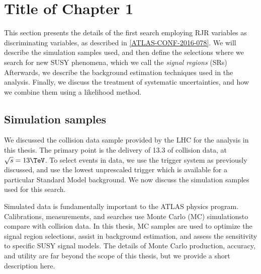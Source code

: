 

\chapter[A search for supersymmetric particles in zero lepton final states with the Recursive Jigsaw Technique][Top of Page Title]{Title of Chapter 1}

This section presents the details of the first search employing RJR variables as discriminating variables, as described in \ref{ATLAS-CONF-2016-078}.
We will describe the simulation samples used, and then define the selections where we search for new SUSY phenomena, which we call the \textit{signal regions} (SRs)
Afterwards, we describe the background estimation techniques used in the analysis.
Finally, we discuss the treatment of systematic uncertainties, and how we combine them using a likelihood method\cite{Baak:2014wma}.

\section{Simulation samples}

We discussed the collision data sample provided by the LHC for the analysis in this thesis.
The primary point is the delivery of 13.3 \ifb of collision data, at $\sqrt{s} = 13 \TeV$.
To select events in data, we use the trigger system as previously discussed, and use the lowest unprescaled trigger which is available for a particular Standard Model background.
We now discuss the simulation samples used for this search.

Simulated data is fundamentally important to the ATLAS physics program.
Calibrations, measurements, and searches use Monte Carlo (MC) simulations\footnotemark to compare with collision data.
In this thesis, MC samples are used to optimize the signal region selections, assist in background estimation, and assess the sensitivity to specific SUSY signal models.
The details of Monte Carlo production, accuracy, and utility are far beyond the scope of this thesis, but we provide a short description here.

